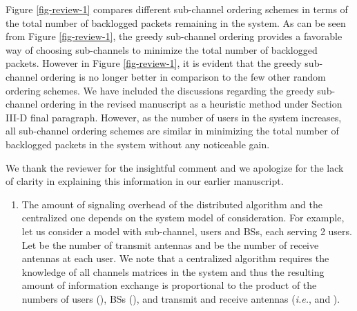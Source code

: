 \begin{enumerate}
	Figure \ref{fig-review-1} compares different sub-channel ordering schemes in terms of the total number of backlogged packets remaining in the system. As can be seen from Figure \ref{fig-review-1}, the greedy sub-channel ordering provides a favorable way of choosing sub-channels to minimize the total number of backlogged packets. However in Figure \ref{fig-review-1}, it is evident that the greedy sub-channel ordering is no longer better in comparison to the few other random ordering schemes. We have included the discussions regarding the greedy sub-channel ordering in the revised manuscript as a heuristic method under Section III-D final paragraph. However, as the number of users in the system increases, all sub-channel ordering schemes are similar in minimizing the total number of backlogged packets in the system without any noticeable gain.
	
	 
	
	\resp
	We thank the reviewer for the insightful comment and we apologize for the lack of clarity in explaining this information in our earlier manuscript.
	\begin{enumerate}
		\item The amount of signaling overhead of the distributed algorithm and the centralized one depends on the system model of consideration. For example, let us consider a model with  sub-channel,  users and  \acp{BS}, each serving 2 users. Let  be the number of transmit antennas and  be the number of receive antennas at each user. We note that a centralized algorithm requires the knowledge of all channels matrices in the system and thus the resulting amount of information exchange is proportional to the product of the numbers of users (), \acp{BS} (), and transmit and receive antennas (\textit{i.e.},  and ).
		

\end{enumerate}
\end{enumerate}
